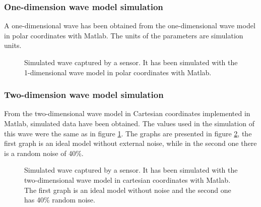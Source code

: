 \documentclass[12pt, a4paper]{article} %
\begin{document}
\setlength{\parskip}{0mm}

\newpage
\subsubsection{One-dimension wave model simulation}

\setlength{\parskip}{0mm}

A one-dimensional wave has been obtained from the one-dimensional wave model in polar coordinates with Matlab. The units of the parameters are simulation units.

\setlength{\parskip}{4mm}

\begin{figure}[htbp]
    \centering
    
    \caption{Simulated wave captured by a sensor. It has been simulated with the 1-dimensional wave model in polar coordinates with Matlab.}
    \label{fig:modelo1}
\end{figure}

\setlength{\parskip}{0mm}

\subsubsection{Two-dimension wave model simulation}

From the two-dimensional wave model in Cartesian coordinates implemented in Matlab, simulated data have been obtained. The values used in the simulation of this wave were the same as in figure \ref{fig:modelo1}. The graphs are presented in figure \ref{fig:modelo2}, the first graph is an ideal model without external noise, while in the second one there is a random noise of 40\%.

\setlength{\parskip}{4mm}

\begin{figure}[h!]
    \centering
    
    \caption{Simulated wave captured by a sensor. It has been simulated with the two-dimensional wave model in cartesian coordinates with Matlab. The first graph is an ideal model without noise and the second one has 40\% random noise.}
    \label{fig:modelo2}
\end{figure}
\end{document}

